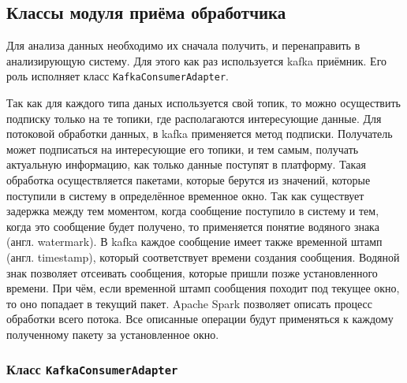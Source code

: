 \subsection{Классы модуля приёма обработчика}
Для анализа данных необходимо их сначала получить, и перенаправить в анализирующую систему.
Для этого как раз используется kafka приёмник.
Его роль исполняет класс \texttt{KafkaConsumerAdapter}.

Так как для каждого типа даных используется свой топик, то можно осуществить подписку только на те топики, где располагаются интересующие данные.
Для потоковой обработки данных, в kafka применяется метод подписки.
Получатель может подписаться на интересующие его топики, и тем самым, получать актуальную информацию, как только данные поступят в платформу.
Такая обработка осуществляется пакетами, которые берутся из значений, которые поступили в систему в определённое временное окно.
Так как существует задержка между тем моментом, когда сообщение поступило в систему и тем, когда это сообщение будет получено, то применяется понятие водяного знака (англ. watermark).
В kafka каждое сообщение имеет также временной штамп (англ. timestamp), который соответствует времени создания сообщения.
Водяной знак позволяет отсеивать сообщения, которые пришли позже установленного времени.
При чём, если временной штамп сообщения походит под текущее окно, то оно попадает в текущий пакет.
Apache Spark позволяет описать процесс обработки всего потока.
Все описанные операции будут применяться к каждому полученному пакету за установленное окно.


\subsubsection{Класс \texttt{KafkaConsumerAdapter}}


